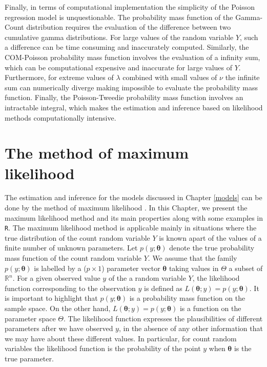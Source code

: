 \documentclass[9pt,a5paper,]{book}
\theoremstyle{definition}
\theoremstyle{definition}
\theoremstyle{remark}
\begin{document}
Finally, in terms of computational implementation the simplicity of the
Poisson regression model is unquestionable. The probability mass
function of the Gamma-Count distribution requires the evaluation of the
difference between two cumulative gamma distributions. For large values
of the random variable \(Y\), such a difference can be time consuming
and inaccurately computed. Similarly, the COM-Poisson probability mass
function involves the evaluation of a infinity sum, which can be
computational expensive and inaccurate for large values of \(Y\).
Furthermore, for extreme values of \(\lambda\) combined with small
values of \(\nu\) the infinite sum can numerically diverge making
impossible to evaluate the probability mass function. Finally, the
Poisson-Tweedie probability mass function involves an intractable
integral, which makes the estimation and inference based on likelihood
methods computationally intensive.

\chapter{The method of maximum likelihood}\label{likelihood}

The estimation and inference for the models discussed in Chapter
\ref{models} can be done by the method of maximum likelihood
\citep{Silvey:1975}. In this Chapter, we present the maximum likelihood
method and its main properties along with some examples in \texttt{R}.
The maximum likelihood method is applicable mainly in situations where
the true distribution of the count random variable \(Y\) is known apart
of the values of a finite number of unknown parameters. Let
\(p(y;\boldsymbol{\theta})\) denote the true probability mass function
of the count random variable \(Y\). We assume that the family
\(p(y;\boldsymbol{\theta})\) is labelled by a (\(p \times 1\)) parameter
vector \(\boldsymbol{\theta}\) taking values in \(\Theta\) a subset of
\(\mathbb{R}^n\). For a given observed value \(y\) of the a random
variable \(Y\), the likelihood function corresponding to the observation
\(y\) is defined as
\(L(\boldsymbol{\theta};y) = p(y;\boldsymbol{\theta})\). It is important
to highlight that \(p(y;\boldsymbol{\theta})\) is a probability mass
function on the sample space. On the other hand,
\(L(\boldsymbol{\theta};y) = p(y;\boldsymbol{\theta})\) is a function on
the parameter space \(\Theta\). The likelihood function expresses the
plausibilities of different parameters after we have observed \(y\), in
the absence of any other information that we may have about these
different values. In particular, for count random variables the
likelihood function is the probability of the point \(y\) when
\(\boldsymbol{\theta}\) is the true parameter.
\end{document}
